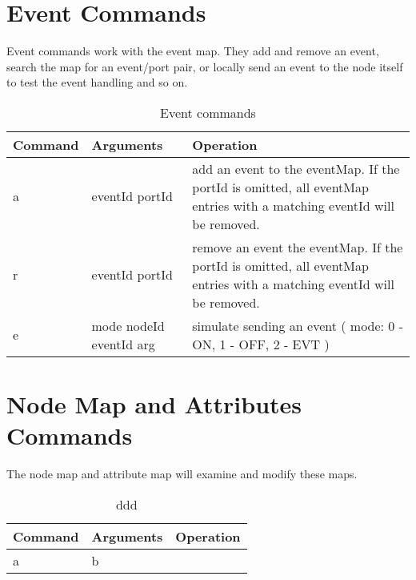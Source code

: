 \section{Event Commands}

Event commands work with the event map. They add and remove an event, search the map for an event/port pair, or locally send an event to the node itself to test the event handling and so on.

\begin{table}[ht!]
    \begin{center}
        \caption{Event commands}
        \begin{tabular}{|l|l|p{}|}
            \toprule
            \textbf{Command} & \textbf{Arguments}  & \textbf{Operation} \\
            \midrule
            a & eventId portId & add an event to the eventMap. If the portId is omitted, all eventMap entries with a matching eventId will be removed.\\
            \midrule
            r & eventId portId & remove an event the eventMap. If the portId is omitted, all eventMap entries with a matching eventId will be removed.\\
            \midrule
            e & mode nodeId eventId arg & simulate sending an event ( mode: 0 - ON, 1 - OFF, 2 - EVT ) \\
            \bottomrule
        \end{tabular}
    \end{center}
\end{table}
\FloatBarrier

\section{Node Map and Attributes Commands}

The node map and attribute map will examine and modify these maps.

\begin{table}[ht!]
    \begin{center}
        \caption{ddd}
        \begin{tabular}{|l|l|p{}|}
            \toprule
            \textbf{Command} & \textbf{Arguments}  & \textbf{Operation} \\
            \midrule
            a & b & \\
            \bottomrule
        \end{tabular}
    \end{center}
\end{table}
\FloatBarrier

